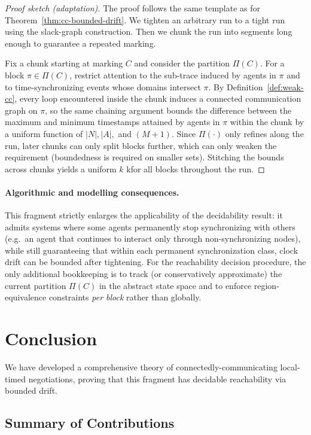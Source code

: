 \begin{proof}[Proof sketch (adaptation)]
The proof follows the same template as for Theorem~\ref{thm:cc-bounded-drift}.
We tighten an arbitrary run to a tight run using the slack-graph construction.
Then we chunk the run into segments long enough to guarantee a repeated marking.

Fix a chunk starting at marking $C$ and consider the partition $\Pi(C)$.
For a block $\pi\in\Pi(C)$, restrict attention to the sub-trace induced by agents in $\pi$
and to time-synchronizing events whose domains intersect $\pi$.
By Definition~\ref{def:weak-cc}, every loop encountered inside the chunk induces a connected communication graph on $\pi$,
so the same chaining argument bounds the difference between the maximum and minimum timestamps attained by agents in $\pi$
within the chunk by a uniform function of $|N|,|A|,$ and $(M+1)$.
Since $\Pi(\cdot)$ only refines along the run, later chunks can only split blocks further,
which can only weaken the requirement (boundedness is required on smaller sets).
Stitching the bounds across chunks yields a uniform $k$ kfor all blocks throughout the run.
\end{proof}

\paragraph{Algorithmic and modelling consequences.}
This fragment strictly enlarges the applicability of the decidability result:
it admits systems where some agents permanently stop synchronizing with others
(e.g.\ an agent that continues to interact only through non-synchronizing nodes),
while still guaranteeing that within each permanent synchronization class,
clock drift can be bounded after tightening.
For the reachability decision procedure, the only additional bookkeeping is to track (or conservatively approximate) the current partition $\Pi(C)$ in the abstract state space and to enforce region-equivalence constraints \emph{per block} rather than globally.

\section{Conclusion}
\label{sec:conclusion}

We have developed a comprehensive theory of connectedly-communicating local-timed negotiations, proving that this fragment has decidable reachability via bounded drift.

\subsection{Summary of Contributions}

